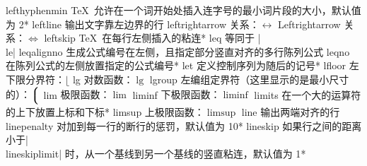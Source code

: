 \capcs lefthyphenmin {\TeX\ 允许在一个词开始处插入连字号的最小词片段的大小，默认值为 2}*{}
\capcs leftline {输出文字靠左边界的行}{}{}
\capcs leftrightarrow {关系：$\leftrightarrow$}{}{}
\capcs Leftrightarrow {关系：$\Leftrightarrow$}{}{}
\capcs leftskip {\TeX\ 在每行左侧插入的粘连}*{}
\capcs leq {等同于 |\\le|}{}{}
\capcs leqalignno {生成公式编号在左侧，且指定部分竖直对齐的多行陈列公式}{}{}
\capcs leqno {在陈列公式的左侧放置指定的公式编号}*{}
\capcs let {定义控制序列为随后的记号}*{}
\capcs lfloor {左下限分界符：$\lfloor$}{}{}
\capcs lg {对数函数：$\lg$}{}{}
\capcs lgroup {左编组定界符（这里显示的是最小尺寸的）：$\Big\lgroup$}{}{}
\capcs lim {极限函数：$\lim$}{}{}
\capcs liminf {下极限函数：$\liminf$}{}{}
\capcs limits {在一个大的运算符的上下放置上标和下标}*{}
\capcs limsup {上极限函数：$\limsup$}{}{}
\capcs line {输出两端对齐的行}{}{}
\capcs linepenalty {对加到每一行的断行的惩罚，默认值为 10}*{}
\capcs lineskip {如果行之间的距离小于|\\lineskiplimit| 时，从一个基线到另一个基线的竖直粘连，默认值为 1\pt}*{}
